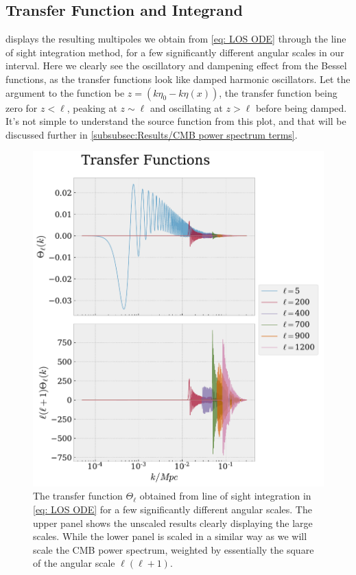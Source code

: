 \documentclass[10pt,a4paper]{article}
\begin{document}
\subsection{Transfer Function and Integrand}
\label{subsec:Results/Transfer and integrand}
 displays the resulting multipoles we obtain from \cref{eq: LOS ODE} through the line of sight integration method, for a few significantly different angular scales in our interval. Here we clearly see the oscillatory and dampening effect from the Bessel functions, as the transfer functions look like damped harmonic oscillators. Let the argument to the function be $z = \left(k\eta_0-k\eta(x)\right)$, the transfer function being zero for $z<\ell$, peaking at $z\sim\ell$ and oscillating at $z>\ell$ before being damped. It's not simple to understand the source function from this plot, and that will be discussed further in \cref{subsubsec:Results/CMB power spectrum terms}.
\begin{figure}[ht!]
  \centering
  \includegraphics[scale=0.5]{../figs/transfer_integrand_transfer.pdf}
  \caption{The transfer function $\Theta_\ell$ obtained from line of sight integration in \cref{eq: LOS ODE} for a few significantly different angular scales. The upper panel shows the unscaled results clearly displaying the large scales. While the lower panel is scaled in a similar way as we will scale the CMB power spectrum, weighted by essentially the square of the angular scale $\ell(\ell+1)$.}
  \label{fig: transfer}
\end{figure}
\end{document}

